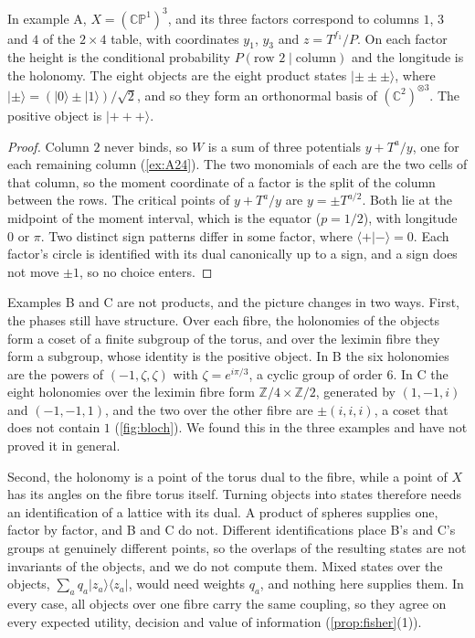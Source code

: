 \documentclass[11pt]{article}
\theoremstyle{definition}\newtheorem{definition}[theorem]{Definition}\newtheorem{remark}[theorem]{Remark}\newtheorem{example}[theorem]{Example}\newtheorem{problem}[theorem]{Open problem}\crefname{problem}{Problem}{Problems}
\begin{document}
\begin{proposition}\label{prop:bloch}
In example A, $X=(\mathbb{CP}^1)^3$, and its three factors correspond to columns $1$, $3$ and $4$ of the $2\times4$ table, with coordinates $y_1$, $y_3$ and $z=T^{f_1}/P$. On each factor the height is the conditional probability $P(\text{row }2\mid\text{column})$ and the longitude is the holonomy. The eight objects are the eight product states $|{\pm}{\pm}{\pm}\rangle$, where $|\pm\rangle=(|0\rangle\pm|1\rangle)/\sqrt2$, and so they form an orthonormal basis of $(\mathbb C^2)^{\otimes3}$. The positive object is $|{+}{+}{+}\rangle$.
\end{proposition}

\begin{proof}
Column $2$ never binds, so $W$ is a sum of three potentials $y+T^a/y$, one for each remaining column (\cref{ex:A24}). The two monomials of each are the two cells of that column, so the moment coordinate of a factor is the split of the column between the rows. The critical points of $y+T^a/y$ are $y=\pm T^{a/2}$. Both lie at the midpoint of the moment interval, which is the equator ($p=1/2$), with longitude $0$ or $\pi$. Two distinct sign patterns differ in some factor, where $\langle+|-\rangle=0$. Each factor's circle is identified with its dual canonically up to a sign, and a sign does not move $\pm1$, so no choice enters.
\end{proof}

Examples B and C are not products, and the picture changes in two ways. First, the phases still have structure. Over each fibre, the holonomies of the objects form a coset of a finite subgroup of the torus, and over the leximin fibre they form a subgroup, whose identity is the positive object. In B the six holonomies are the powers of $(-1,\zeta,\zeta)$ with $\zeta=e^{i\pi/3}$, a cyclic group of order $6$. In C the eight holonomies over the leximin fibre form $\mathbb Z/4\times\mathbb Z/2$, generated by $(1,-1,i)$ and $(-1,-1,1)$, and the two over the other fibre are $\pm(i,i,i)$, a coset that does not contain $1$ (\cref{fig:bloch}). We found this in the three examples and have not proved it in general.

Second, the holonomy is a point of the torus dual to the fibre, while a point of $X$ has its angles on the fibre torus itself. Turning objects into states therefore needs an identification of a lattice with its dual. A product of spheres supplies one, factor by factor, and B and C do not. Different identifications place B's and C's groups at genuinely different points, so the overlaps of the resulting states are not invariants of the objects, and we do not compute them. Mixed states over the objects, $\sum_aq_a|z_a\rangle\langle z_a|$, would need weights $q_a$, and nothing here supplies them. In every case, all objects over one fibre carry the same coupling, so they agree on every expected utility, decision and value of information (\cref{prop:fisher}(1)).
\end{document}
